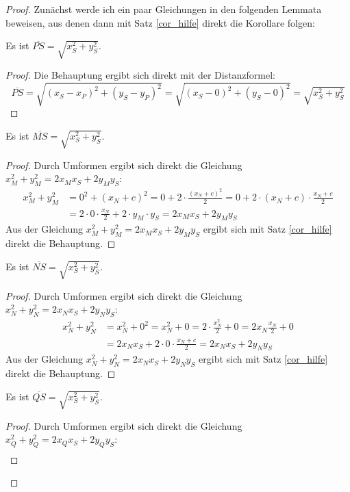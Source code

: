 \begin{proof}
    Zunächst werde ich ein paar Gleichungen in den folgenden Lemmata beweisen, aus denen dann mit Satz \ref{cor_hilfe}
    direkt die Korollare folgen:
    \begin{lem}\label{no_P}
        Es ist $\overline{PS}=\sqrt{x_S^2+y_S^2}$.
    \end{lem}
    \begin{proof}
        Die Behauptung ergibt sich direkt mit der Distanzformel:
        \[
        \overline{PS}=\sqrt{(x_S-x_P)^2+(y_S-y_P)^2}=\sqrt{(x_S-0)^2+(y_S-0)^2}=\sqrt{x_S^2+y_S^2}    
        \]
    \end{proof}
    \begin{lem}\label{no_M}
        Es ist $\overline{MS}=\sqrt{x_S^2+y_S^2}$.
    \end{lem}
    \begin{proof}
        Durch Umformen ergibt sich direkt die Gleichung $x_M^2+y_M^2=2x_Mx_S+2y_My_S$:
        \begin{align*}
            x_M^2+y_M^2&=0^2+(x_N+c)^2=0+2\cdot \frac{(x_N+c)^2}{2}=0+2\cdot (x_N+c)\cdot\frac{x_N+c}{2}\\
            &=2\cdot 0\cdot \frac{x_N}{2}+2\cdot y_M\cdot y_S=2x_Mx_S+2y_My_S
        \end{align*}
        Aus der Gleichung $x_M^2+y_M^2=2x_Mx_S+2y_My_S$ ergibt sich mit Satz \ref{cor_hilfe} direkt die Behauptung.
    \end{proof}
    \begin{lem}\label{no_N}
        Es ist $\overline{NS}=\sqrt{x_S^2+y_S^2}$.
    \end{lem}
    \begin{proof}
        Durch Umformen ergibt sich direkt die Gleichung $x_N^2+y_N^2=2x_Nx_S+2y_Ny_S$:
        \begin{align*}
            x_N^2+y_N^2&=x_N^2+0^2=x_N^2+0=2\cdot \frac{x_N^2}{2}+0=2x_N\frac{x_N}{2}+0\\
            &=2x_Nx_S+2\cdot 0\cdot \frac{x_N+c}{2}=2x_Nx_S+2y_Ny_S
        \end{align*}
        Aus der Gleichung $x_N^2+y_N^2=2x_Nx_S+2y_Ny_S$ ergibt sich mit Satz \ref{cor_hilfe} direkt die Behauptung.
    \end{proof}
    \begin{lem}\label{no_Q}
        Es ist $\overline{QS}=\sqrt{x_S^2+y_S^2}$.
    \end{lem}
    \begin{proof}
        Durch Umformen ergibt sich direkt die Gleichung $x_Q^2+y_Q^2=2x_Qx_S+2y_Qy_S$:
        \begin{align*}

\end{align*}
\end{proof}
\end{proof}
